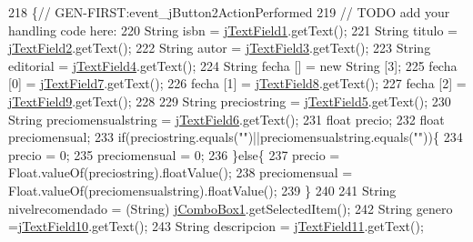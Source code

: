 \begin{DoxyCode}
218                                                                          \{\textcolor{comment}{//
      GEN-FIRST:event\_jButton2ActionPerformed}
219         \textcolor{comment}{// TODO add your handling code here:}
220         String isbn = \mbox{\hyperlink{class_interfaz_package_1_1_alta_libro_lectura_aa23404c288ffab1e9e7e349e4336cc20}{jTextField1}}.getText();
221         String titulo = \mbox{\hyperlink{class_interfaz_package_1_1_alta_libro_lectura_a27642fe481c01e307cab4843cc5d86b8}{jTextField2}}.getText();
222         String autor = \mbox{\hyperlink{class_interfaz_package_1_1_alta_libro_lectura_a51e44050eaeb982b64b831c47c61302f}{jTextField3}}.getText();
223         String editorial = \mbox{\hyperlink{class_interfaz_package_1_1_alta_libro_lectura_a9270f2ef1de5103cae58610ae6f84a4e}{jTextField4}}.getText();
224         String fecha [] = \textcolor{keyword}{new} String [3];
225         fecha [0] = \mbox{\hyperlink{class_interfaz_package_1_1_alta_libro_lectura_a36a5981735d729d529ba7e20cb9182da}{jTextField7}}.getText();
226         fecha [1] = \mbox{\hyperlink{class_interfaz_package_1_1_alta_libro_lectura_a3d4c846fbcd44478ef1bb950c38d6f57}{jTextField8}}.getText();
227         fecha [2] = \mbox{\hyperlink{class_interfaz_package_1_1_alta_libro_lectura_aac3e23145bb542e8d96109c1ab458fa1}{jTextField9}}.getText();
228         
229         String preciostring = \mbox{\hyperlink{class_interfaz_package_1_1_alta_libro_lectura_a9780c336f84357f6c171a8ccd8f8a94b}{jTextField5}}.getText();
230         String preciomensualstring = \mbox{\hyperlink{class_interfaz_package_1_1_alta_libro_lectura_a064748cc16381a3773e64995629181b2}{jTextField6}}.getText();
231         \textcolor{keywordtype}{float} precio;
232         \textcolor{keywordtype}{float} preciomensual;
233         \textcolor{keywordflow}{if}(preciostring.equals(\textcolor{stringliteral}{""})||preciomensualstring.equals(\textcolor{stringliteral}{""}))\{
234             precio = 0;
235             preciomensual = 0;
236         \}\textcolor{keywordflow}{else}\{
237         precio = Float.valueOf(preciostring).floatValue();
238         preciomensual = Float.valueOf(preciomensualstring).floatValue();
239         \}
240         
241         String nivelrecomendado = (String) \mbox{\hyperlink{class_interfaz_package_1_1_alta_libro_lectura_ac1e5e88822746a9f922ab99cab5fd21b}{jComboBox1}}.getSelectedItem();
242         String genero =\mbox{\hyperlink{class_interfaz_package_1_1_alta_libro_lectura_a937dab20a07279280f73c9b235398043}{jTextField10}}.getText();
243         String descripcion = \mbox{\hyperlink{class_interfaz_package_1_1_alta_libro_lectura_a0de30e644010e7a1c4aab54936597f18}{jTextField11}}.getText();

\end{DoxyCode}
